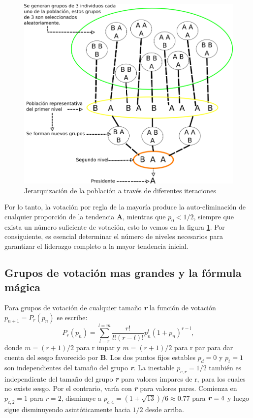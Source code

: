 \begin{figure}[!ht]
    \centering
    \includegraphics[scale=0.50]{TT/img/marco teorico/prediccion.png}
    \caption{Jerarquización de la población a través de diferentes iteraciones}
    \label{graphic:prediccion}
\end{figure}

Por lo tanto, la votación por regla de la mayoría produce la auto-eliminación de cualquier proporción de la tendencia \textbf{A}, mientras que $p_{0} < 1/2$, siempre que exista un número suficiente de votación, esto lo vemos en la figura \ref{graphic:prediccion}. Por consiguiente, es esencial determinar el número de niveles necesarios para garantizar el liderazgo completo a la mayor tendencia inicial. \cite{Galam2008}

\subsection{Grupos de votación mas grandes y la fórmula mágica}
Para grupos de votación de cualquier tamaño \textbf{\textit{r}} la función de votación $p_{n+1} = P_{r}(p_{n})$ se escribe:
\begin{equation}
    P_{r}(p_{n}) = \sum_{l=r}^{l=m} \frac{r!}{l!(r-l)!}p_{n}^{l}(1+p_{n})^{r-l},
\end{equation}
donde $m = (r + 1)/2$ para r impar y $m = (r + 1)/2$ para r par para dar cuenta del sesgo favorecido por \textbf{B}. Los dos puntos fijos estables $p_{d} = 0$ y $p_{t} = 1$ son independientes del tamaño del grupo \textbf{\textit{r}}. La inestable $p_{c,r} = 1/2$ también es independiente del tamaño del grupo \textbf{\textit{r}} para valores impares de r, para los cuales no existe sesgo. Por el contrario, varía con \textbf{\textit{r}} para valores pares. Comienza en $p_{c,2} = 1$ para $r = 2$, disminuye a $p_{c,4} = (1 + \sqrt{13})/6 \approx 0.77$ para $\textbf{\textit{r}} = 4$ y luego sigue disminuyendo asintóticamente hacia $1/2$ desde arriba.

